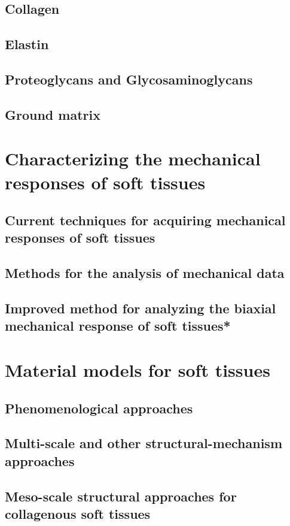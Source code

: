 \subsection{Collagen}
\subsection{Elastin}
\subsection{Proteoglycans and Glycosaminoglycans}
\subsection{Ground matrix}

\section{Characterizing the mechanical responses of soft tissues}
\subsection{Current techniques for acquiring mechanical responses of soft tissues}
\subsection{Methods for the analysis of mechanical data}
\subsection{Improved method for analyzing the biaxial mechanical response of soft tissues*}

\section{Material models for soft tissues}
\subsection{Phenomenological approaches}
\subsection{Multi-scale and other structural-mechanism approaches}
\subsection{Meso-scale structural approaches for collagenous soft tissues}


